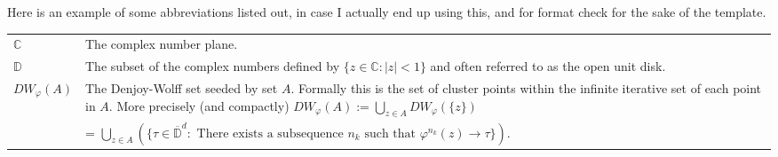 Here is an example of some abbreviations listed out, in case I actually end up using this, and for format check for the sake of the template.\\
\noindent
\begin{tabularx}{\textwidth}{lX}
$\mathbb{C}$ & The complex number plane.\\
$\mathbb{D}$ & The subset of the complex numbers defined by $\{z\in\mathbb{C}: |z| < 1\}$ and often referred to as the open unit disk. \\
$DW_\varphi(A)$ & The Denjoy-Wolff set seeded by set $A$. Formally this is the set of cluster points within the infinite iterative set of each point in $A$. More precisely (and compactly) \linebreak $DW_\varphi(A) := \bigcup\limits_{z\in A}DW_\varphi(\{z\})$ \\ 
& \hspace*{1.5cm}= $\bigcup\limits_{z\in A} \left( \{\tau \in \overline{\mathbb{D}}^d:\text{ There exists a subsequence } n_k\text{ such that } \varphi^{n_k}(z) \rightarrow \tau \} \right)$.
\end{tabularx}
